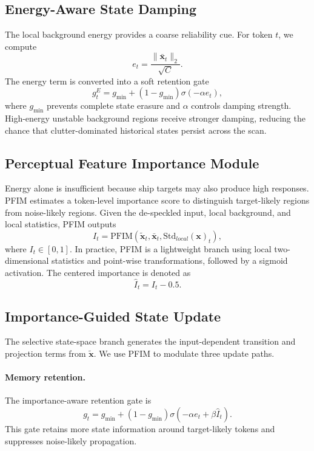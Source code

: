 \documentclass[10pt,twocolumn]{article}
\begin{document}
\subsection{Energy-Aware State Damping}

The local background energy provides a coarse reliability cue. For token $t$, we compute
\begin{equation}
  e_t = \frac{\|\bar{\mathbf{x}}_t\|_2}{\sqrt{C}}.
\end{equation}
The energy term is converted into a soft retention gate
\begin{equation}
  g^{E}_t = g_{\min} + (1-g_{\min})\sigma(-\alpha e_t),
\end{equation}
where $g_{\min}$ prevents complete state erasure and $\alpha$ controls damping strength. High-energy unstable background regions receive stronger damping, reducing the chance that clutter-dominated historical states persist across the scan.

\subsection{Perceptual Feature Importance Module}

Energy alone is insufficient because ship targets may also produce high responses. PFIM estimates a token-level importance score to distinguish target-likely regions from noise-likely regions. Given the de-speckled input, local background, and local statistics, PFIM outputs
\begin{equation}
  I_t = \mathrm{PFIM}(\widetilde{\mathbf{x}}_t,\bar{\mathbf{x}}_t,\mathrm{Std}_{local}(\mathbf{x})_t),
\end{equation}
where $I_t\in[0,1]$. In practice, PFIM is a lightweight branch using local two-dimensional statistics and point-wise transformations, followed by a sigmoid activation. The centered importance is denoted as
\begin{equation}
  \hat{I}_t = I_t - 0.5.
\end{equation}

\subsection{Importance-Guided State Update}

The selective state-space branch generates the input-dependent transition and projection terms from $\widetilde{\mathbf{x}}$. We use PFIM to modulate three update paths.

\paragraph{Memory retention.}
The importance-aware retention gate is
\begin{equation}
  g_t = g_{\min} + (1-g_{\min})\sigma(-\alpha e_t + \beta \hat{I}_t).
  \label{eq:gamma-twocol}
\end{equation}
This gate retains more state information around target-likely tokens and suppresses noise-likely propagation.
\end{document}
